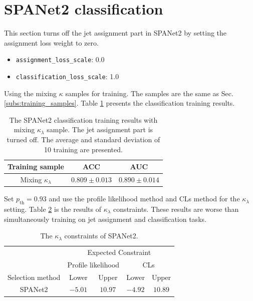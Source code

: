 \documentclass[12pt]{article}
\begin{document}
\section{SPANet2 classification}%
\label{sec:spanet2_classification}
	This section turns off the jet assignment part in SPANet2 by setting the assignment loss weight to zero.
	\begin{itemize}
		\item \verb+assignment_loss_scale+: 0.0
		\item \verb+classification_loss_scale+: 1.0
	\end{itemize}

	Using the mixing $\kappa$ samples for training. The samples are the same as Sec. \ref{subs:training_samples}. Table \ref{tab:SPANET_no_pairing_cls_results} presents the classification training results.
	\begin{table}[htpb]
		\centering
		\caption{The SPANet2 classification training results with mixing $\kappa_\lambda$ sample. The jet assignment part is turned off. The average and standard deviation of 10 training are presented.}
		\label{tab:SPANET_no_pairing_cls_results}
		\begin{tabular}{c|cc}
		Training sample        & ACC     & AUC   \\ \hline
		Mixing $\kappa_\lambda $ & $0.809 \pm 0.013$ & $0.890 \pm 0.014$
		\end{tabular}      
	\end{table}

	Set $p_\text{th} = 0.93$ and use the profile likelihood method and CLs method for the $\kappa_\lambda$ setting. Table \ref{tab:kappa_constraint_SPANet_no_pair} is the results of $\kappa_\lambda$ constraints. These results are worse than simultaneously training on jet assignment and classification tasks.
	\begin{table}[htpb]
		\centering
		\caption{The $\kappa_\lambda$ constraints of SPANet2.}
		\label{tab:kappa_constraint_SPANet_no_pair}
		\begin{tabular}{c|cc|cc}
							  & \multicolumn{4}{c}{Expected Constraint}                          \\
							  & \multicolumn{2}{c}{Profile likelihood} & \multicolumn{2}{c}{CLs} \\ \hline
		Selection method      & Lower              & Upper             & Lower      & Upper      \\ \hline
		SPANet2      & $-5.01$            & $10.97$             & $-4.92$      & $10.89$      \\
		\end{tabular}
	\end{table}
\end{document}
